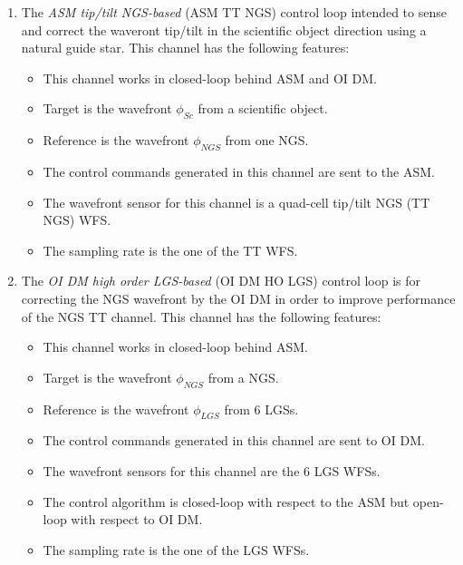 \begin{enumerate}
	\item The \emph{ASM tip/tilt NGS-based} (ASM TT NGS)  control loop
	intended to sense and correct the waveront tip/tilt in the scientific object
	direction using a natural guide star. This channel has
	the following features:
	\begin{itemize}
		\item This channel works in closed-loop behind ASM and OI DM.
		\item Target is the wavefront $\phi_{Sc}$ from a scientific object.
		\item Reference is the wavefront $\phi_{NGS}$ from one NGS.
		\item The control commands generated in this channel are sent to the ASM.
		\item The wavefront sensor for this channel is a quad-cell tip/tilt NGS
		(TT NGS) WFS.
	  \item The sampling rate is the one of the TT WFS.
	\end{itemize}

  \item The \emph{OI DM high order LGS-based} (OI DM HO LGS)
   control loop is for
  correcting the NGS wavefront by the OI DM in order to improve performance of
  the NGS TT channel. This channel has the following features:
  \begin{itemize}
	  \item This channel works in closed-loop behind ASM.
	  \item Target is the wavefront $\phi_{NGS}$ from a NGS.
	  \item Reference is the wavefront $\phi_{LGS}$ from 6 LGSs.
	  \item The control commands generated in this channel are sent to OI DM.
	  \item The wavefront sensors for this channel are the 6 LGS WFSs.
    \item The control algorithm is closed-loop with respect to the ASM but
    open-loop with respect to OI DM.
	  \item The sampling rate is the one of the LGS WFSs.
	\end{itemize}


\end{enumerate}

